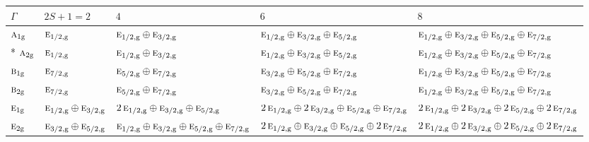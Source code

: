 \documentclass[10pt,a4paper]{article}
\numberwithin{equation}{section}
\newcommand{\irr}[1]{\text{\normalfont\scshape #1}}
\newcommand{\ptag}[1]{\mathrm{#1}}
\begin{document}
{\small\setlength{\tabcolsep}{3pt}\begin{longtable}{@{}l>{\RaggedRight\arraybackslash}p{}>{\RaggedRight\arraybackslash}p{}>{\RaggedRight\arraybackslash}p{}>{\RaggedRight\arraybackslash}p{}@{}}\toprule
$\Gamma$ & $2S + 1 = 2$ & $4$ & $6$ & $8$\\\midrule\endhead
\bottomrule\endfoot\endlastfoot
$\irr{a}_{1\ptag{g}}$ & $\irr{e}_{1/2,\ptag{g}}$ & $\irr{e}_{1/2,\ptag{g}}\oplus \irr{e}_{3/2,\ptag{g}}$ & $\irr{e}_{1/2,\ptag{g}}\oplus \irr{e}_{3/2,\ptag{g}}\oplus \irr{e}_{5/2,\ptag{g}}$ & $\irr{e}_{1/2,\ptag{g}}\oplus \irr{e}_{3/2,\ptag{g}}\oplus \irr{e}_{5/2,\ptag{g}}\oplus \irr{e}_{7/2,\ptag{g}}$\\*
$\irr{a}_{2\ptag{g}}$ & $\irr{e}_{1/2,\ptag{g}}$ & $\irr{e}_{1/2,\ptag{g}}\oplus \irr{e}_{3/2,\ptag{g}}$ & $\irr{e}_{1/2,\ptag{g}}\oplus \irr{e}_{3/2,\ptag{g}}\oplus \irr{e}_{5/2,\ptag{g}}$ & $\irr{e}_{1/2,\ptag{g}}\oplus \irr{e}_{3/2,\ptag{g}}\oplus \irr{e}_{5/2,\ptag{g}}\oplus \irr{e}_{7/2,\ptag{g}}$\\
$\irr{b}_{1\ptag{g}}$ & $\irr{e}_{7/2,\ptag{g}}$ & $\irr{e}_{5/2,\ptag{g}}\oplus \irr{e}_{7/2,\ptag{g}}$ & $\irr{e}_{3/2,\ptag{g}}\oplus \irr{e}_{5/2,\ptag{g}}\oplus \irr{e}_{7/2,\ptag{g}}$ & $\irr{e}_{1/2,\ptag{g}}\oplus \irr{e}_{3/2,\ptag{g}}\oplus \irr{e}_{5/2,\ptag{g}}\oplus \irr{e}_{7/2,\ptag{g}}$\\
$\irr{b}_{2\ptag{g}}$ & $\irr{e}_{7/2,\ptag{g}}$ & $\irr{e}_{5/2,\ptag{g}}\oplus \irr{e}_{7/2,\ptag{g}}$ & $\irr{e}_{3/2,\ptag{g}}\oplus \irr{e}_{5/2,\ptag{g}}\oplus \irr{e}_{7/2,\ptag{g}}$ & $\irr{e}_{1/2,\ptag{g}}\oplus \irr{e}_{3/2,\ptag{g}}\oplus \irr{e}_{5/2,\ptag{g}}\oplus \irr{e}_{7/2,\ptag{g}}$\\
$\irr{e}_{1\ptag{g}}$ & $\irr{e}_{1/2,\ptag{g}}\oplus \irr{e}_{3/2,\ptag{g}}$ & $2\,\irr{e}_{1/2,\ptag{g}}\oplus \irr{e}_{3/2,\ptag{g}}\oplus \irr{e}_{5/2,\ptag{g}}$ & $2\,\irr{e}_{1/2,\ptag{g}}\oplus 2\,\irr{e}_{3/2,\ptag{g}}\oplus \irr{e}_{5/2,\ptag{g}}\oplus \irr{e}_{7/2,\ptag{g}}$ & $2\,\irr{e}_{1/2,\ptag{g}}\oplus 2\,\irr{e}_{3/2,\ptag{g}}\oplus 2\,\irr{e}_{5/2,\ptag{g}}\oplus 2\,\irr{e}_{7/2,\ptag{g}}$\\
$\irr{e}_{2\ptag{g}}$ & $\irr{e}_{3/2,\ptag{g}}\oplus \irr{e}_{5/2,\ptag{g}}$ & $\irr{e}_{1/2,\ptag{g}}\oplus \irr{e}_{3/2,\ptag{g}}\oplus \irr{e}_{5/2,\ptag{g}}\oplus \irr{e}_{7/2,\ptag{g}}$ & $2\,\irr{e}_{1/2,\ptag{g}}\oplus \irr{e}_{3/2,\ptag{g}}\oplus \irr{e}_{5/2,\ptag{g}}\oplus 2\,\irr{e}_{7/2,\ptag{g}}$ & $2\,\irr{e}_{1/2,\ptag{g}}\oplus 2\,\irr{e}_{3/2,\ptag{g}}\oplus 2\,\irr{e}_{5/2,\ptag{g}}\oplus 2\,\irr{e}_{7/2,\ptag{g}}$\\

\end{longtable}}
\end{document}
